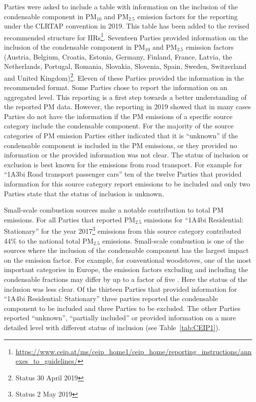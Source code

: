 {Parties were asked to include a table with information on the inclusion of the condensable component in PM$_{10}$ and PM$_{2.5}$
emission factors for the reporting under the CLRTAP convention in 2019. This table has been added to the revised
recommended structure for IIRs\footnote{\url{https://www.ceip.at/ms/ceip_home1/ceip_home/reporting_instructions/annexes_to_guidelines/} }. Seventeen Parties
provided information on the inclusion of the condensable component in  PM$_{10}$ and PM$_{2.5}$ emission factors (Austria,
Belgium, Croatia, Estonia, Germany, Finland, France, Latvia, the Netherlands, Portugal, Romania, Slovakia, Slovenia,
Spain, Sweden, Switzerland  and United Kingdom)\footnote{Status 30 April 2019}. Eleven of these Parties provided the
information in the recommended format. Some Parties chose to report the information on an aggregated level. This
reporting is a first step towards a better understanding of the reported PM data. However, the reporting in 2019 showed
that in many cases Parties do not have the information if the PM emissions of a specific source category include the
condensable component. For the majority of the source categories of PM emission Parties either indicated that it is
``unknown'' if the condensable component is included in the PM emissions, or they provided no information or the
provided information was not clear. The status of inclusion or exclusion is best known for the emissions from road
transport. For example for ``1A3bi Road transport passenger cars'' ten of the twelve Parties that provided information
for this source category report emissions to be included and only two Parties state that the status of inclusion is
unknown.

Small-scale combustion sources make a notable contribution to total PM emissions. For all Parties that reported PM$_{2.5}$
emissions for ``1A4bi Residential: Stationary'' for the year 2017\footnote{ Status 2 May 2019} emissions from this
source category contributed 44\% to the national total PM$_{2.5}$ emissions. Small-scale combustion is one of the sources
where the inclusion of the condensable component has the largest impact on the emission factor. For example, for
conventional woodstoves, one of the most important categories in Europe, the emission factors excluding and including
the condensable fractions may differ by up to a factor of five \citep{DeniervanderGon2015}.  Here the
status of the inclusion was less clear. Of the thirteen Parties that provided information for ``1A4bi Residential:
Stationary'' three parties reported the condensable component to be included and three Parties to be excluded. The
other Parties reported ``unknown'', ``partially included'' or provided information on a more detailed level with
different status of inclusion (see Table~\ref{tab:CEIP1}).


}
